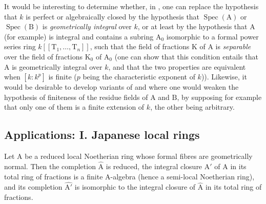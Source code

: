 \begin{remark}[7.5.8]
\label{IV.7.5.8}
It would be interesting to determine whether, in , one can replace the hypothesis that $k$ is perfect or algebraically closed by the hypothesis that $\operatorname{Spec}(\mathrm{A})$ or $\operatorname{Spec}(\mathrm{B})$ is \emph{geometrically integral} over $k$, or at least by the hypothesis that $\mathrm{A}$ (for example) is integral and contains a subring $\mathrm{A}_0$ isomorphic to a formal power series ring $k[\![\mathrm{T}_1,\ldots,\mathrm{T}_n]\!]$, such that the field of fractions $\mathrm{K}$ of $\mathrm{A}$ is \emph{separable} over the field of fractions $\mathrm{K}_0$ of $\mathrm{A}_0$ (one can show that this condition entails that $\mathrm{A}$ is geometrically integral over $k$, and that the two properties are equivalent when $[k:k^p]$ is finite ($p$ being the characteristic exponent of $k$)). Likewise, it would be desirable to develop variants of  and  where one would weaken the hypothesis of finiteness of the residue fields of $\mathrm{A}$ and $\mathrm{B}$, by supposing for example that only one of them is a finite extension of $k$, the other being arbitrary.
\end{remark}


\subsection{Applications: I. Japanese local rings}
\label{subsection:IV.7.6}

\begin{proposition}[7.6.1]
\label{IV.7.6.1}
Let $\mathrm{A}$ be a reduced local Noetherian ring whose formal fibres are geometrically normal. Then the completion $\widehat{\mathrm{A}}$ is reduced, the integral closure $\mathrm{A}'$ of $\mathrm{A}$ in its total ring of fractions is a finite $\mathrm{A}$-algebra (hence a semi-local Noetherian ring), and its completion $\widehat{\mathrm{A}'}$ is isomorphic to the integral closure of $\widehat{\mathrm{A}}$ in its total ring of fractions.
\end{proposition}

